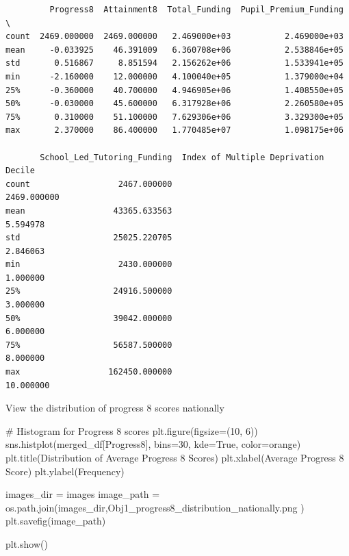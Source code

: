 \documentclass[
  letterpaper,
  DIV=11,
  numbers=noendperiod]{scrartcl}
\newenvironment{Shaded}{\begin{snugshade}}{\end{snugshade}}
\newcommand{\CommentTok}[1]{\textcolor[rgb]{0.37,0.37,0.37}{#1}}
\newcommand{\DecValTok}[1]{\textcolor[rgb]{0.68,0.00,0.00}{#1}}
\newcommand{\NormalTok}[1]{\textcolor[rgb]{0.00,0.23,0.31}{#1}}
\newcommand{\OperatorTok}[1]{\textcolor[rgb]{0.37,0.37,0.37}{#1}}
\newcommand{\StringTok}[1]{\textcolor[rgb]{0.13,0.47,0.30}{#1}}
\newcommand{\VariableTok}[1]{\textcolor[rgb]{0.07,0.07,0.07}{#1}}
\begin{document}
\begin{verbatim}
         Progress8  Attainment8  Total_Funding  Pupil_Premium_Funding  \
count  2469.000000  2469.000000   2.469000e+03           2.469000e+03   
mean     -0.033925    46.391009   6.360708e+06           2.538846e+05   
std       0.516867     8.851594   2.156262e+06           1.533941e+05   
min      -2.160000    12.000000   4.100040e+05           1.379000e+04   
25%      -0.360000    40.700000   4.946905e+06           1.408550e+05   
50%      -0.030000    45.600000   6.317928e+06           2.260580e+05   
75%       0.310000    51.100000   7.629306e+06           3.329300e+05   
max       2.370000    86.400000   1.770485e+07           1.098175e+06   

       School_Led_Tutoring_Funding  Index of Multiple Deprivation Decile  
count                  2467.000000                           2469.000000  
mean                  43365.633563                              5.594978  
std                   25025.220705                              2.846063  
min                    2430.000000                              1.000000  
25%                   24916.500000                              3.000000  
50%                   39042.000000                              6.000000  
75%                   56587.500000                              8.000000  
max                  162450.000000                             10.000000  
\end{verbatim}

View the distribution of progress 8 scores nationally

\begin{Shaded}
\begin{Highlighting}[]
\CommentTok{\# Histogram for Progress 8 scores}
\NormalTok{plt.figure(figsize}\OperatorTok{=}\NormalTok{(}\DecValTok{10}\NormalTok{, }\DecValTok{6}\NormalTok{))}
\NormalTok{sns.histplot(merged\_df[}\StringTok{\textquotesingle{}Progress8\textquotesingle{}}\NormalTok{], bins}\OperatorTok{=}\DecValTok{30}\NormalTok{, kde}\OperatorTok{=}\VariableTok{True}\NormalTok{, color}\OperatorTok{=}\StringTok{\textquotesingle{}orange\textquotesingle{}}\NormalTok{)}
\NormalTok{plt.title(}\StringTok{\textquotesingle{}Distribution of Average Progress 8 Scores\textquotesingle{}}\NormalTok{)}
\NormalTok{plt.xlabel(}\StringTok{\textquotesingle{}Average Progress 8 Score\textquotesingle{}}\NormalTok{)}
\NormalTok{plt.ylabel(}\StringTok{\textquotesingle{}Frequency\textquotesingle{}}\NormalTok{)}


\NormalTok{images\_dir }\OperatorTok{=} \StringTok{\textquotesingle{}images\textquotesingle{}}
\NormalTok{image\_path }\OperatorTok{=}\NormalTok{ os.path.join(images\_dir,}\StringTok{\textquotesingle{}Obj1\_progress8\_distribution\_nationally.png\textquotesingle{}}\NormalTok{ )}
\NormalTok{plt.savefig(image\_path)}

\NormalTok{plt.show()}
\end{Highlighting}
\end{Shaded}
\end{document}
